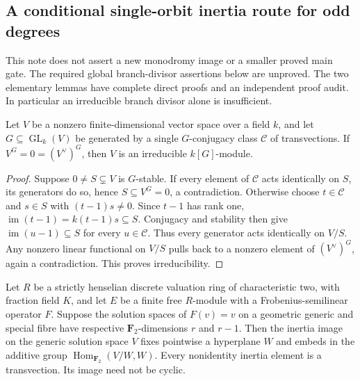 \subsection{A conditional single-orbit inertia route for odd degrees}

This note does not assert a new monodromy image or a smaller proved main
gate. The required global branch-divisor assertions below are unproved.
The two elementary lemmas have complete direct proofs and an independent
proof audit. In particular an irreducible branch divisor alone is insufficient.

\begin{lemma}
\label{lem:root-single-transvection-class}
Let $V$ be a nonzero finite-dimensional vector space over a field $k$, and
let $G\subseteq\operatorname{GL}_k(V)$ be generated by a single
$G$-conjugacy class $\mathcal C$ of transvections. If
$V^G=0=(V^\vee)^G$, then $V$ is an irreducible $k[G]$-module.

\end{lemma}
\begin{proof}
Suppose $0\ne S\subsetneq V$ is $G$-stable. If every element of
$\mathcal C$ acts identically on $S$, its generators do so, hence
$S\subseteq V^G=0$, a contradiction. Otherwise choose $t\in\mathcal C$
and $s\in S$ with $(t-1)s\ne0$. Since $t-1$ has rank one,
$\operatorname{im}(t-1)=k(t-1)s\subseteq S$. Conjugacy and stability
then give $\operatorname{im}(u-1)\subseteq S$ for every
$u\in\mathcal C$. Thus every generator acts identically on $V/S$.
Any nonzero linear functional on $V/S$ pulls back to a nonzero element
of $(V^\vee)^G$, again a contradiction. This proves irreducibility.

\end{proof}
\begin{lemma}
\label{lem:root-corank-one-Lang-inertia}
Let $R$ be a strictly henselian discrete valuation ring of characteristic
two, with fraction field $K$, and let $E$ be a finite free $R$-module
with a Frobenius-semilinear operator $F$. Suppose the solution spaces
of $F(v)=v$ on a geometric generic and special fibre have respective
$\mathbf F_2$-dimensions $r$ and $r-1$. Then the inertia image on the
generic solution space $V$ fixes pointwise a hyperplane $W$ and embeds
in the additive group
$\operatorname{Hom}_{\mathbf F_2}(V/W,W)$. Every nonidentity inertia
element is a transvection. Its image need not be cyclic.

\end{lemma}
